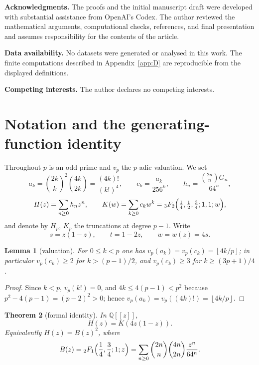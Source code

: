 \documentclass[11pt]{amsart}
\newtheorem{theorem}{Theorem}[section]
\newtheorem{lemma}[theorem]{Lemma}
\theoremstyle{definition}
\theoremstyle{remark}
\newcommand{\Q}{\mathbb{Q}}
\newcommand{\fl}[1]{\left\lfloor #1 \right\rfloor}
\begin{document}
\medskip

\textbf{Acknowledgments.} The proofs and the initial manuscript draft
were developed with substantial assistance from OpenAI's Codex. The
author reviewed the mathematical arguments, computational checks,
references, and final presentation and assumes responsibility for the
contents of the article.

\medskip
\noindent\textbf{Data availability.} No datasets were generated or
analysed in this work.  The finite computations described in
Appendix~\ref{app:D} are reproducible from the displayed definitions.

\medskip
\noindent\textbf{Competing interests.} The author declares no competing
interests.

\section{Notation and the generating-function identity}\label{sec:2}

Throughout $p$ is an odd prime and $v_p$ the $p$-adic valuation. We set
\[
a_k=\binom{2k}{k}^2\binom{4k}{2k}=\frac{(4k)!}{(k!)^4},
\qquad
c_k=\frac{a_k}{256^k},
\qquad
h_n=\frac{\binom{2n}{n}G_n}{64^n},
\]
\[
H(z)=\sum_{n\ge0}h_nz^n,\qquad
K(w)=\sum_{k\ge0}c_kw^k
={}_3F_2\Bigl(\tfrac14,\tfrac12,\tfrac34;1,1;w\Bigr),
\]
and denote by $H_p$, $K_p$ the truncations at degree $p-1$. Write
\[
s=z(1-z),\qquad t=1-2z,\qquad w=w(z)=4s .
\]

\begin{lemma}[valuation]\label{lem:val}
For $0\le k<p$ one has
$v_p(a_k)=v_p(c_k)=\fl{4k/p}$; in particular $v_p(c_k)\ge2$ for
$k>(p-1)/2$, and $v_p(c_k)\ge3$ for $k\ge(3p+1)/4$.
\end{lemma}

\begin{proof}
Since $k<p$, $v_p(k!)=0$, and $4k\le4(p-1)<p^2$ because
$p^2-4(p-1)=(p-2)^2>0$; hence $v_p(a_k)=v_p((4k)!)=\fl{4k/p}$.
\end{proof}

\begin{theorem}[formal identity]\label{thm:A}
In $\Q[[z]]$,
\[
H(z)=K(4z(1-z)).
\]
Equivalently $H(z)=B(z)^2$, where
\[
B(z)={}_2F_1\Bigl(\frac14,\frac34;1;z\Bigr)
=\sum_{n\ge0}\binom{2n}{n}\binom{4n}{2n}\frac{z^n}{64^n}.
\]
\end{theorem}
\end{document}
